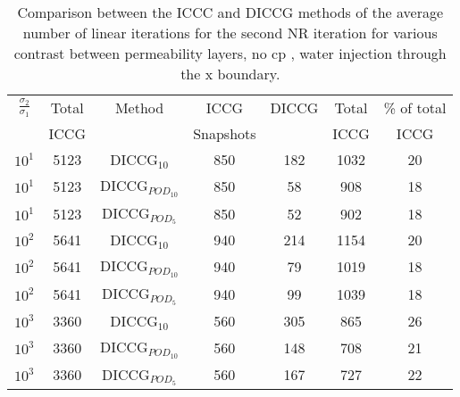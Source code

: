 \documentclass[a4paper,10pt]{report}
\begin{document}
\begin{table}[!ht]\centering
\begin{minipage}{1\textwidth}
 \centering
\begin{tabular}{ ||c|c||c|c|c|c|c||} 
\hline
$\frac{\sigma_2}{\sigma_1}$&Total&Method  & ICCG&DICCG &Total&\% of total\\ 
                           & ICCG     &  & Snapshots& &ICCG& ICCG\\ 
\hline 
$10^{1}$ &5123& DICCG$_{10}$&850&182&1032&20\\ 
\hline  
$10^{1}$ &5123& DICCG$_{POD_{10}}$&850&58&908&18 \\ 
\hline  
$10^{1}$ &5123& DICCG$_{POD_{5}}$&850&52&902&18 \\ 
\hline 
$10^{2}$ &5641& DICCG$_{10}$&940&214&1154&20\\ 
\hline  
$10^{2}$ &5641& DICCG$_{POD_{10}}$&940&79&1019&18 \\ 
\hline  
$10^{2}$ &5641& DICCG$_{POD_{5}}$&940&99&1039&18 \\ 
\hline 
$10^{3}$ &3360& DICCG$_{10}$&560&305&865&26\\ 
\hline  
$10^{3}$ &3360& DICCG$_{POD_{10}}$&560&148&708&21 \\ 
\hline  
$10^{3}$ &3360& DICCG$_{POD_{5}}$&560&167&727&22 \\ 
\hline  
\end{tabular} 
\caption{Comparison between the ICCC and DICCG methods of the average number of linear iterations for the second NR iteration for various contrast between permeability layers, no cp , water injection through the x boundary. }\label{table:litertot2} 
\end{minipage}  
\end{table}  
\end{document}
